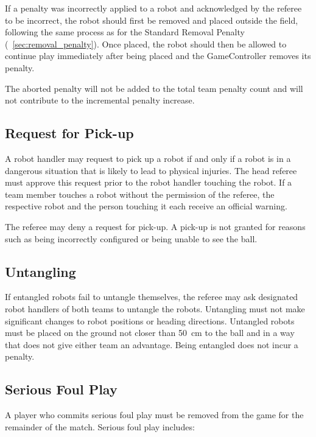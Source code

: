 If a penalty was incorrectly applied to a robot and acknowledged by the referee to be incorrect, the robot should first be removed and placed outside the field, following the same process as for the Standard Removal Penalty (\cf~\cref{sec:removal_penalty}). Once placed, the robot should then be allowed to continue play immediately after being placed and the GameController removes its penalty.

The aborted penalty will not be added to the total team penalty count and will not contribute to the incremental penalty increase.

\subsection{Request for Pick-up}
\label{sec:request_for_pick_up}

A robot handler may request to pick up a robot if and only if a robot is in a dangerous situation that is likely to lead to physical injuries. The head referee must approve this request prior to the robot handler touching the robot. If a team member touches a robot without the permission of the referee, the respective robot and the person touching it each receive an official warning.

The referee may deny a request for pick-up. A pick-up is not granted for reasons such as being incorrectly configured or being unable to see the ball.

\subsection{Untangling}
\label{sec:untangling}

If entangled robots fail to untangle themselves, the referee may ask designated robot handlers of both teams to untangle the robots. Untangling must not make significant changes to robot positions or heading directions. Untangled robots must be placed on the ground not closer than \qty{50}{\centi\metre} to the ball and in a way that does not give either team an advantage. Being entangled does not incur a penalty.

\subsection{Serious Foul Play}
\label{sec:serious_foul_play}

A player who commits serious foul play must be removed from the game for the remainder of the match. Serious foul play includes:

